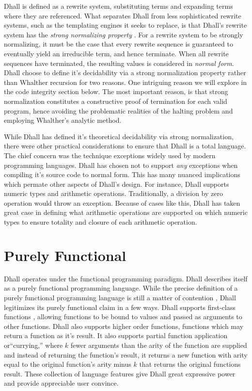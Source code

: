 \documentclass[12pt]{diazessay}
\begin{document}
Dhall is defined as a rewrite system, substituting terms and expanding terms where they are referenced.
What separates Dhall from less sophisticated rewrite systems, such as the templating engines it seeks to replace, is that Dhall's rewrite system has the \emph{strong normalizing property} \cite{bergstra1982strong}.
For a rewrite system to be strongly normalizing, it must be the case that every rewrite sequence is guaranteed to eventually yield an irreducible term, and hence terminate.
When all rewrite sequences have terminated, the resulting values is considered in \emph{normal form}.
Dhall choose to define it's decidability via a strong normalization property rather than Whalther recursion for two reasons.
One intriguing reason we will explore in the code integrity section below.
The most important reason, is that strong normalization constitutes a constructive proof of termination for each valid program, hence avoiding the problematic realities of the halting problem and employing Whalther's analytic method.


While Dhall has defined it's theoretical decidability via strong normalization, there were other practical considerations to ensure that Dhall is a total language.
The chief concern was the technique exceptions widely used by modern programming languages.
Dhall has chosen not to support \emph{any} exceptions when compiling it's source code to normal form.
This has many nuanced implications which permate other aspects of Dhall's design.
For instance, Dhall supports numeric types and arithmetic operations.
Traditionally, a division by zero operation would throw an exception.
Because of cases like this, Dhall has taken great case in defining what arithmetic operations are supported on which numeric types to ensure totality and closure of each arithmetic operation.

\section*{Purely Functional}

Dhall operates under the functional programming paradigm.
Dhall describes itself as a purely functional programming language.
While the precise definition of a purely functional programming language is still a matter of contention \cite{sabry1998purely}, Dhall legitimizes its purely functional claim in a few ways.
Dhall supports first-class functions \cite{abelson1996structure}, allowing functions to be bound to values and passed as arguments to other functions.
Dhall also supports higher order functions, functions which may return a function as it's result.
It also supports partial function application \cite{curry1958combinatory} or``currying,'' where $k$ fewer arguments than the arity \cite{hazewinkel2011encyclopaedia} of the function are supplied and instead of returning the function's result, it returns a new function with arity equal to the original function's arity minus $k$ that returns the original functions result.
These collection of language features give Dhall great expressive power and provide appreciable user convince.
\end{document}
